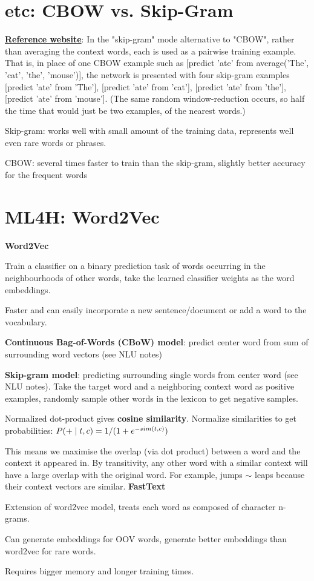 \documentclass[12pt]{article}
\begin{document}
\section{etc: CBOW vs. Skip-Gram}
\par \href{https://stackoverflow.com/questions/38287772/cbow-v-s-skip-gram-why-invert-context-and-target-words#}{\textbf{Reference website}}: In the "skip-gram" mode alternative to "CBOW", rather than averaging the context words, each is used as a pairwise training example. That is, in place of one CBOW example such as [predict 'ate' from average('The', 'cat', 'the', 'mouse')], the network is presented with four skip-gram examples [predict 'ate' from 'The'], [predict 'ate' from 'cat'], [predict 'ate' from 'the'], [predict 'ate' from 'mouse']. (The same random window-reduction occurs, so half the time that would just be two examples, of the nearest words.)
\ulb
\item Skip-gram: works well with small amount of the training data, represents well even rare words or phrases.
\item CBOW: several times faster to train than the skip-gram, slightly better accuracy for the frequent words
\ule

\section{ML4H: Word2Vec}
\textbf{Word2Vec}
\ulb
\item Train a classifier on a binary prediction task of words occurring in the neighbourhoods of other words, take the learned classifier weights as the word embeddings.
\item Faster and can easily incorporate a new sentence/document or add a word to the vocabulary.
\item \textbf{Continuous Bag-of-Words (CBoW) model}: predict center word from sum of surrounding word vectors (see NLU notes)
\item \textbf{Skip-gram model}: predicting surrounding single words from center word (see NLU notes). Take the target word and a neighboring context word as positive examples, randomly sample other words in the lexicon to get negative samples.
\item Normalized dot-product gives \textbf{cosine similarity}. Normalize similarities to get probabilities: $P(+  \mid  t,c) = 1 / (1 + e^{-sim(t,c)})$
\item This means we maximise the overlap (via dot product) between a word and the context it appeared in. By transitivity, any other word with a similar context will have a large overlap with the original word. For example, jumps $\sim$ leaps because their context vectors are similar.
\ule
\textbf{FastText}
\ulb
\item Extension of word2vec model, treats each word as composed of character n-grams.
\item Can generate embeddings for OOV words, generate better embeddings than word2vec for rare words.
\item Requires bigger memory and longer training times.
\ule
\end{document}
